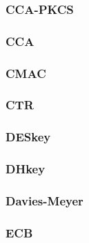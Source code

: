 \begin{frame} \frametitle{CCA-PKCS}
\begin{figure}
\begin{center}

\end{center}
\end{figure}
\end{frame}
\begin{frame} \frametitle{CCA}
\begin{figure}
\begin{center}

\end{center}
\end{figure}
\end{frame}
\begin{frame} \frametitle{CMAC}
\begin{figure}
\begin{center}

\end{center}
\end{figure}
\end{frame}
\begin{frame} \frametitle{CTR}
\begin{figure}
\begin{center}

\end{center}
\end{figure}
\end{frame}
\begin{frame} \frametitle{DESkey}
\begin{figure}
\begin{center}

\end{center}
\end{figure}
\end{frame}
\begin{frame} \frametitle{DHkey}
\begin{figure}
\begin{center}

\end{center}
\end{figure}
\end{frame}
\begin{frame} \frametitle{Davies-Meyer}
\begin{figure}
\begin{center}

\end{center}
\end{figure}
\end{frame}
\begin{frame} \frametitle{ECB}
\begin{figure}
\begin{center}

\end{center}
\end{figure}
\end{frame}
